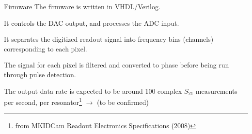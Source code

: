 \documentclass[ignorenonframetext,12pt]{beamer}
\begin{document}
%
%
\begin{frame}{Firmware}
				The firmware is written in VHDL/Verilog.

				It controls the DAC output, and processes the ADC input.

				It separates the digitized readout signal into frequency bins (channels)
				corresponding to each pixel.

				The signal for each pixel is filtered and converted to phase before
				being run through \alert{pulse detection}.

				The output data rate is expected to be around 100 complex $S_{21}$
				measurements per second, per resonator\footnote{\tiny{from
				MKIDCam Readout Electronics Specifications (2008)}} $\to$ (\alert{to be
				confirmed})
\end{frame}
\end{document}
